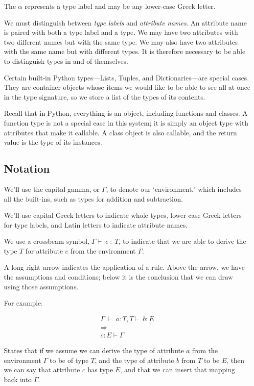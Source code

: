 \documentclass{article}
\begin{document}
The $\alpha$ represents a type label and may be any lower-case Greek letter.

We must distinguish between \emph{type labels} and \emph{attribute names}.  An
attribute name is paired with both a type label and a type. 
We may have two attributes with two different names but with the same type. We
may also have two attributes with the same name but with different types. It is
therefore necessary to be able to distinguish types in and of themselves.

Certain built-in Python types---Lists, Tuples, and Dictionaries---are special cases. They
are container objects whose items we would like to be able to see all at once
in the type signature, so we store a list of the types of its contents.

Recall that in Python, everything is an object, including functions and
classes. A function type is not a special case in this system; it is simply an
object type with attributes that make it callable. A class object is also
callable, and the return value is the type of its instances.

\subsection*{Notation}

We'll use the capital gamma, or $\Gamma$, to denote our `environment,' which
includes all the built-ins, such as types for addition and subtraction.

We'll use capital Greek letters to indicate whole types, lower case Greek
letters for type labels, and Latin letters to indicate attribute names.

We use a crossbeam symbol, $\Gamma \vdash\ e\ :\ T$, to indicate that we are able
to derive the type $T$ for attribute $e$ from the environment $\Gamma$.

A long right arrow indicates the application of a rule. Above the arrow, we
have the assumptions and conditions; below it is the conclusion that we can draw using 
those assumptions.

For example:

\begin{align*}
\Gamma\ \vdash\ a:T, T \vdash\ b:E\\
\Longrightarrow \\
c:E \vdash \Gamma
\end{align*}

States that if we assume we can derive the type of attribute $a$ from the
environment $\Gamma$ to be of type $T$, and the type of attribute $b$ from $T$ to be $E$, then we can say that attribute $c$ has type $E$, and that we can insert that mapping back into $\Gamma$.
\end{document}
